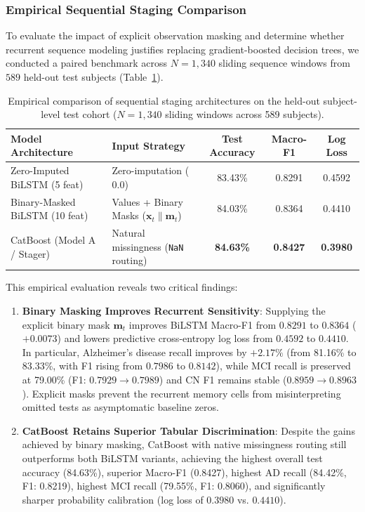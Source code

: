 \subsubsection{Empirical Sequential Staging Comparison}
To evaluate the impact of explicit observation masking and determine whether recurrent sequence modeling justifies replacing gradient-boosted decision trees, we conducted a paired benchmark across $N = 1{,}340$ sliding sequence windows from $589$ held-out test subjects (Table~\ref{tab:bilstm_mask_comparison}).

\begin{table}[H]
\centering
\small
\caption{Empirical comparison of sequential staging architectures on the held-out subject-level test cohort ($N = 1{,}340$ sliding windows across 589 subjects).}
\label{tab:bilstm_mask_comparison}
\begin{tabular}{llccc}
\toprule
\textbf{Model Architecture} & \textbf{Input Strategy} & \textbf{Test Accuracy} & \textbf{Macro-F1} & \textbf{Log Loss} \\
\midrule
Zero-Imputed BiLSTM (5 feat) & Zero-imputation ($0.0$) & 83.43\% & 0.8291 & 0.4592 \\
Binary-Masked BiLSTM (10 feat) & Values + Binary Masks ($\mathbf{x}_t \parallel \mathbf{m}_t$) & 84.03\% & 0.8364 & 0.4410 \\
CatBoost (Model A / Stager) & Natural missingness (\texttt{NaN} routing) & \textbf{84.63\%} & \textbf{0.8427} & \textbf{0.3980} \\
\bottomrule
\end{tabular}
\end{table}

This empirical evaluation reveals two critical findings:
\begin{enumerate}
    \item \textbf{Binary Masking Improves Recurrent Sensitivity}: Supplying the explicit binary mask $\mathbf{m}_t$ improves BiLSTM Macro-F1 from $0.8291$ to $0.8364$ ($+0.0073$) and lowers predictive cross-entropy log loss from $0.4592$ to $0.4410$. In particular, Alzheimer's disease recall improves by $+2.17\%$ (from 81.16\% to 83.33\%, with F1 rising from $0.7986$ to $0.8142$), while MCI recall is preserved at 79.00\% (F1: $0.7929 \to 0.7989$) and CN F1 remains stable ($0.8959 \to 0.8963$). Explicit masks prevent the recurrent memory cells from misinterpreting omitted tests as asymptomatic baseline zeros.
    \item \textbf{CatBoost Retains Superior Tabular Discrimination}: Despite the gains achieved by binary masking, CatBoost with native missingness routing still outperforms both BiLSTM variants, achieving the highest overall test accuracy (84.63\%), superior Macro-F1 (0.8427), highest AD recall (84.42\%, F1: 0.8219), highest MCI recall (79.55\%, F1: 0.8060), and significantly sharper probability calibration (log loss of $0.3980$ vs. $0.4410$).
\end{enumerate}


